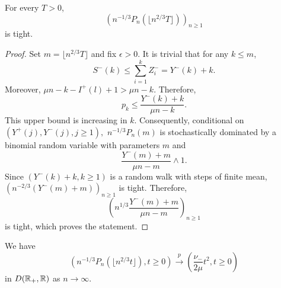 \begin{lemma}\label{lemma.tightnesssurplusedges}
 For every $T>0$, $$\left(n^{-1/3}P_n\left(\lfloor  n^{2/3}T\rfloor \right) \right)_{n\geq 1}$$ 
 is tight.
 \end{lemma}
 \begin{proof}
Set $m=\lfloor  n^{2/3}T\rfloor$ and fix $\epsilon>0$. It is trivial that for any $k\leq m$, $$S^{-}(k)\leq \sum_{i=1}^k Z^-_i=Y^-(k)+k.$$ Moreover, $\mu n - k -I^{+}(l)+1>\mu n-k$.  Therefore, $$p_k\leq \frac{Y^-(k)+k}{\mu n - k}.$$
This upper bound is increasing in $k$. Consequently, conditional on $(Y^+(j),Y^-(j),j\geq 1),$ $n^{-1/3}P_n(m)$ is stochastically dominated by a binomial random variable with parameters  $m$ and $$\frac{Y^-(m)+m}{\mu n - m}\wedge 1.$$
Since $(Y^-(k)+k,k\geq 1)$ is a random walk with steps of finite mean, $\left(n^{-2/3}(Y^-(m)+m)\right)_{n\geq 1}$ is tight. Therefore,
$$\left(n^{1/3} \frac{Y^-(m)+m}{\mu n - m}\right)_{n\geq 1}$$ is tight, which proves the statement.
\end{proof}
\begin{lemma}\label{lemma.convergenceQandP}
We have  
$$\left(n^{-1/3}P_n(\lfloor n^{2/3}t\rfloor), t \geq 0\right)\overset{p}{\to} \left(\frac{\nu_-}{2\mu} t^2, t\geq 0\right)$$
in $D({\mathbb R}_+,{\mathbb R})$ as $n\to \infty$.

\end{lemma}
